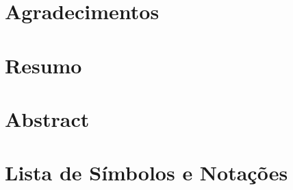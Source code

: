 \documentclass[12pt,oneside,hidelinks,a4paper,final]{book}
\begin{document}
	
	

	\newpage

	

	\newpage

	

	\chapter*{Agradecimentos}
	

	\chapter*{Resumo}%
	
	\thispagestyle{empty}
	\newpage

	\chapter*{Abstract}%
	
	\thispagestyle{empty}
	\newpage


	\listoffigures 	
	\newpage

	\listoftables 
	\thispagestyle{empty}
	\newpage

	\chapter*{Lista de Símbolos e Notações}
	
	\thispagestyle{empty}
	\newpage

	\tableofcontents 
	\thispagestyle{empty}
	\newpage


	\pagestyle{plain} %
	
\end{document}
